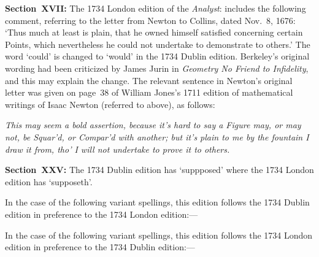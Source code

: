 \smallskip

\item{}
{\bf Section~XVII:}
The 1734 London edition of the {\it Analyst\/}: includes
the following comment, referring to the letter from
Newton to Collins, dated Nov.~8, 1676: `Thus much at least
is plain, that he owned himself satisfied concerning certain
Points, which nevertheless he could not undertake to
demonstrate to others.'  The word `could' is changed to
`would' in the 1734 Dublin edition.  Berkeley's original
wording had been criticized by James Jurin in {\it Geometry
No Friend to Infidelity}, and this may explain the change.
The relevant sentence in Newton's original letter was given
on page~38 of William Jones's 1711 edition of mathematical writings
of Isaac Newton (referred to above), as follows:

\smallskip

\itemitem{}
{\it 
This may seem a bold assertion, because it's hard to say a Figure
may, or may not, be Squar'd, or Compar'd with another; but it's
plain to me by the fountain I draw it from, tho' I will not
undertake to prove it to others.}

\smallskip

\item{}
{\bf Section~XXV:}
The 1734 Dublin edition has `suppposed' where the 1734 London
edition has `supposeth'.

\bigbreak

In the case of the following variant spellings, this edition
follows the 1734 Dublin edition in preference to the 1734
London edition:---

\smallskip


\bigbreak

In the case of the following variant spellings, this edition
follows the 1734 London edition in preference to the 1734
Dublin edition:---

\smallskip


